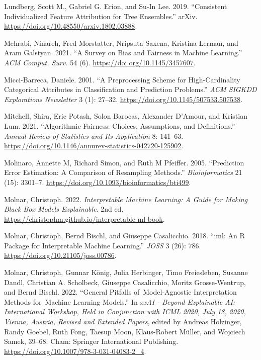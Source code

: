 \begin{CSLReferences}{1}{0}
\leavevmode{}%
Lundberg, Scott M., Gabriel G. Erion, and Su-In Lee. 2019. {``Consistent
Individualized Feature Attribution for Tree Ensembles.''} arXiv.
\url{https://doi.org/10.48550/arxiv.1802.03888}.

\leavevmode{}%
Mehrabi, Ninareh, Fred Morstatter, Nripsuta Saxena, Kristina Lerman, and
Aram Galstyan. 2021. {``A Survey on Bias and Fairness in Machine
Learning.''} \emph{ACM Comput. Surv.} 54 (6).
\url{https://doi.org/10.1145/3457607}.

\leavevmode{}%
Micci-Barreca, Daniele. 2001. {``A Preprocessing Scheme for
High-Cardinality Categorical Attributes in Classification and Prediction
Problems.''} \emph{{ACM} {SIGKDD} Explorations Newsletter} 3 (1):
27--32. \url{https://doi.org/10.1145/507533.507538}.

\leavevmode{}%
Mitchell, Shira, Eric Potash, Solon Barocas, Alexander D'Amour, and
Kristian Lum. 2021. {``Algorithmic Fairness: Choices, Assumptions, and
Definitions.''} \emph{Annual Review of Statistics and Its Application}
8: 141--63.
\url{https://doi.org/10.1146/annurev-statistics-042720-125902}.

\leavevmode{}%
Molinaro, Annette M, Richard Simon, and Ruth M Pfeiffer. 2005.
{``Prediction Error Estimation: A Comparison of Resampling Methods.''}
\emph{Bioinformatics} 21 (15): 3301--7.
\url{https://doi.org/10.1093/bioinformatics/bti499}.

\leavevmode{}%
Molnar, Christoph. 2022. \emph{Interpretable Machine Learning: A Guide
for Making Black Box Models Explainable}. 2nd ed.
\url{https://christophm.github.io/interpretable-ml-book}.

\leavevmode{}%
Molnar, Christoph, Bernd Bischl, and Giuseppe Casalicchio. 2018.
{``{iml}: An {R} Package for Interpretable Machine Learning.''}
\emph{JOSS} 3 (26): 786. \url{https://doi.org/10.21105/joss.00786}.

\leavevmode{}%
Molnar, Christoph, Gunnar König, Julia Herbinger, Timo Freiesleben,
Susanne Dandl, Christian A. Scholbeck, Giuseppe Casalicchio, Moritz
Grosse-Wentrup, and Bernd Bischl. 2022. {``General Pitfalls
of~Model-Agnostic Interpretation Methods for~Machine Learning Models.''}
In \emph{xxAI - Beyond Explainable AI: International Workshop, Held in
Conjunction with ICML 2020, July 18, 2020, Vienna, Austria, Revised and
Extended Papers}, edited by Andreas Holzinger, Randy Goebel, Ruth Fong,
Taesup Moon, Klaus-Robert Müller, and Wojciech Samek, 39--68. Cham:
Springer International Publishing.
\url{https://doi.org/10.1007/978-3-031-04083-2_4}.


\end{CSLReferences}
